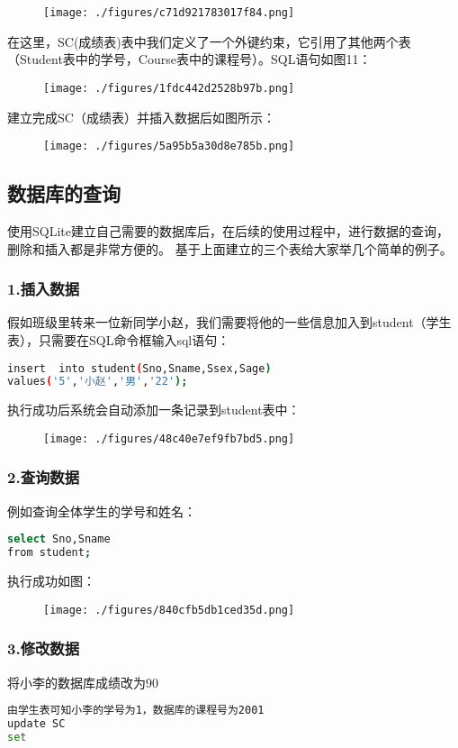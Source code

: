 \begin{figure}[ht]
\centering
\texttt{[image: ./figures/c71d921783017f84.png]}
\caption{} \label{fig_SQLint_10}
\end{figure}

在这里，SC(成绩表)表中我们定义了一个外键约束，它引用了其他两个表（Student表中的学号，Course表中的课程号）。SQL语句如图11：
\begin{figure}[ht]
\centering
\texttt{[image: ./figures/1fdc442d2528b97b.png]}
\caption{} \label{fig_SQLint_11}
\end{figure}

建立完成SC（成绩表）并插入数据后如图所示：
\begin{figure}[ht]
\centering
\texttt{[image: ./figures/5a95b5a30d8e785b.png]}
\caption{} \label{fig_SQLint_12}
\end{figure}

\subsection{数据库的查询}
使用SQLite建立自己需要的数据库后，在后续的使用过程中，进行数据的查询，删除和插入都是非常方便的。
基于上面建立的三个表给大家举几个简单的例子。
\subsubsection{1.插入数据}
假如班级里转来一位新同学小赵，我们需要将他的一些信息加入到student（学生表），只需要在SQL命令框输入sql语句：
\begin{lstlisting}[language=bash]
insert  into student(Sno,Sname,Ssex,Sage)
values('5','小赵','男','22');
\end{lstlisting}
执行成功后系统会自动添加一条记录到student表中：
\begin{figure}[ht]
\centering
\texttt{[image: ./figures/48c40e7ef9fb7bd5.png]}
\caption{} \label{fig_SQLint_13}
\end{figure}
\subsubsection{2.查询数据}
例如查询全体学生的学号和姓名：
\begin{lstlisting}[language=bash]
select Sno,Sname
from student;
\end{lstlisting}

执行成功如图：
\begin{figure}[ht]
\centering
\texttt{[image: ./figures/840cfb5db1ced35d.png]}
\caption{} \label{fig_SQLint_14}
\end{figure}

\subsubsection{3.修改数据}
将小李的数据库成绩改为90
\begin{lstlisting}[language=bash]
由学生表可知小李的学号为1，数据库的课程号为2001
update SC
set 
\end{lstlisting}